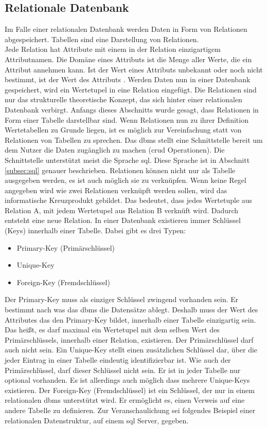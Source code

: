 \subsection{Relationale Datenbank}\label{subsec:relDB}
Im Falle einer relationalen Datenbank werden Daten in Form von Relationen abgespeichert.
Tabellen sind eine Darstellung von Relationen.\\
Jede Relation hat Attribute mit einem in der Relation einzigartigem Attributnamen.
Die Domäne eines Attributs ist die Menge aller Werte, die ein Attribut annehmen kann.
Ist der Wert eines Attributs unbekannt oder noch nicht bestimmt, ist der Wert des Attributs  \citep{Studer:2016:2}.
Werden Daten nun in einer Datenbank gespeichert, wird ein Wertetupel in eine Relation eingefügt.
Die Relationen sind nur das strukturelle theoretische Konzept, das sich hinter einer relationalen Datenbank verbirgt.
Anfangs dieses Abschnitts wurde gesagt, dass Relationen in Form einer Tabelle darstellbar sind.
Wenn Relationen nun zu ihrer Definition Wertetabellen zu Grunde liegen, 
ist es möglich zur Vereinfachung statt von Relationen von Tabellen zu sprechen.
Das \ac{dbms} stellt eine Schnittstelle bereit um dem Nutzer die Daten zugänglich zu machen (\ac{crud} Operationen).
Die Schnittstelle unterstützt meist die Sprache \ac{sql}. Diese Sprache ist in Abschnitt \ref{subsec:sql} genauer beschrieben.
Relationen können nicht nur als Tabelle ausgegeben werden, es ist auch möglich sie zu verknüpfen.
Wenn keine Regel angegeben wird wie zwei Relationen verknüpft werden sollen, wird das informatische Kreuzprodukt gebildet.
Das bedeutet, dass jedes Wertetuple aus Relation A, mit jedem Wertetupel aus Relation B verknüft wird. 
Dadurch entsteht eine neue Relation.
In einer Datenbank existieren immer Schlüssel (Keys) innerhalb einer Tabelle.
Dabei gibt es drei Typen:
\begin{itemize}
  \item Primary-Key (Primärschlüssel)
  \item Unique-Key
  \item Foreign-Key (Fremdschlüssel)
\end{itemize}
Der Primary-Key muss als einziger Schlüssel zwingend vorhanden sein. Er bestimmt nach was das \ac{dbms} die Datensätze ablegt.
Deshalb muss der Wert des Attributes das den Primary-Key bildet, innerhalb einer Tabelle einzigartig sein.
Das heißt, es darf maximal ein Wertetupel mit dem selben Wert des Primärschlüssels, innerhalb einer Relation, existieren.
Der Primärschlüssel darf auch nicht  sein.
Ein Unique-Key stellt einen zusätzlichen Schlüssel dar, über die jeder Eintrag in einer Tabelle eindeutig identifizierbar ist.
Wie auch der Primärschlüssel, darf dieser Schlüssel nicht  sein.
Er ist in jeder Tabelle nur optional vorhanden. Es ist allerdings auch möglich dass mehrere Unique-Keys existieren.
Der Foreign-Key (Fremdschlüssel) ist ein Schlüssel, der nur in einem relationalen \ac{dbms} unterstützt wird.
Er ermöglicht es, einen Verweis auf eine andere Tabelle zu definieren.
Zur Veranschaulichung sei folgendes Beispiel einer relationalen Datenstruktur,
auf einem \ac{sql} Server, gegeben.

